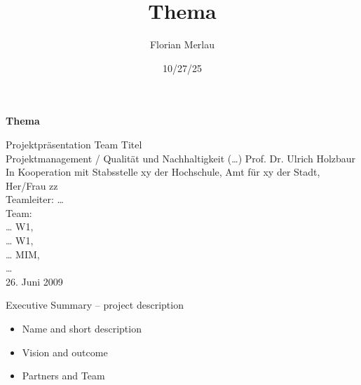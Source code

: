 \documentclass[aspectratio=169,10pt]{beamer}
\title[Thema]{Thema}
\author[Merlau]{Florian Merlau}
\institute[Hochschule Aalen]{Hochschule Aalen}
\date{10/27/25}
\begin{document}
\begin{frame}

\vspace{1cm}
\begin{flushleft}
    {\bfseries\LARGE Thema}
\end{flushleft}

\vspace{1cm}
\justifying
\small
Projektpräsentation Team Titel\\
Projektmanagement / Qualität und Nachhaltigkeit (…)
Prof. Dr. Ulrich Holzbaur\\[0.5em]
In Kooperation mit Stabsstelle xy der Hochschule, Amt für xy der Stadt, Her/Frau zz\\[0.5em]
Teamleiter: …\\[0.5em]
Team: \\
… W1, \\
… W1, \\
… MIM, \\
…\\[0.5em]
26. Juni 2009

\end{frame}

\begin{frame}{Executive Summary – project description}
\begin{itemize}
    \item Name and short description
    \item Vision and outcome
    \item Partners and Team
\end{itemize}
\end{frame}
\end{document}
